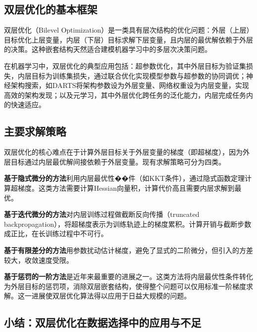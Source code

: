 \subsection{双层优化的基本框架}

双层优化（Bilevel Optimization）是一类具有层次结构的优化问题：外层（上层）目标优化上层变量，内层（下层）目标求解下层变量，且内层的最优解依赖于外层的决策。这种嵌套结构天然适合建模机器学习中的多层次决策问题。

在机器学习中，双层优化的典型应用包括：超参数优化\cite{franceschi2017forward, franceschi2018bilevel, lorraine2020optimizing}，其中外层目标为验证集损失，内层目标为训练集损失，通过联合优化实现模型参数与超参数的协同调优；神经架构搜索，如DARTS\cite{liu2018darts}将架构参数设为外层变量、网络权重设为内层变量，实现高效的架构发现；以及元学习，其中外层优化跨任务的泛化能力，内层完成任务内的快速适应。

\subsection{主要求解策略}

双层优化的核心难点在于计算外层目标关于外层变量的梯度（即超梯度），因为外层目标通过内层最优解间接依赖于外层变量。现有求解策略可分为四类。

\textbf{基于隐式微分的方法}\cite{domke2012generic, grazzi2020iteration, pedregosa2016hyperparameter}利用内层最优性��件（如KKT条件），通过隐式函数定理计算超梯度。这类方法需要计算Hessian向量积，计算代价高且需要内层求解到最优。

\textbf{基于迭代微分的方法}\cite{maclaurin2015gradient, shaban2019truncated}对内层训练过程做截断反向传播（truncated backpropagation），将超梯度表示为训练轨迹上的梯度累积。计算开销与截断步数成正比，在长训练过程中不可行。

\textbf{基于有限差分的方法}\cite{sow2021convergence, yang2023achieving}用参数扰动估计梯度，避免了显式的二阶微分，但引入的方差较大，收敛速度受限。

\textbf{基于惩罚的一阶方法}\cite{chen2023near, kwon2023fully, ye2022bome}是近年来最重要的进展之一。这类方法将内层最优性条件转化为外层目标的惩罚项，消除双层嵌套结构，使得整个问题可以仅用标准一阶梯度求解。这一进展使双层优化算法得以应用于日益大规模的问题\cite{pan2024scalebio}。

\subsection{小结：双层优化在数据选择中的应用与不足}

